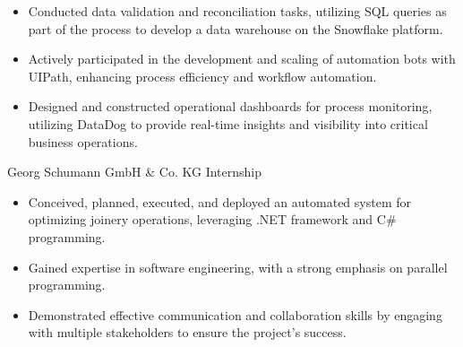 \documentclass[11pt, a4paper]{moderncv}
\newcommand{\de}[1]{}
\newcommand{\en}[1]{#1}
\newcommand{\de}[1]{#1}
\newcommand{\en}[1]{}
\begin{document}
        {\en{
        \begin{itemize}
            \item Conducted data validation and reconciliation tasks, utilizing SQL queries as part of the process to develop a data warehouse on the Snowflake platform.
            \item Actively participated in the development and scaling of automation bots with UIPath, enhancing process efficiency and workflow automation.
            \item Designed and constructed operational dashboards for process monitoring, utilizing DataDog to provide real-time insights and visibility into critical business operations.
        \end{itemize}}
        \de{
        \begin{itemize}
            \item Durchführung von Datenvalidierungs- und Abgleichsaufgaben unter Verwendung von SQL-Abfragen als Teil des Prozesses zur Entwicklung eines Data Warehouse auf der Snowflake-Plattform.
            \item Aktive Beteiligung an der Entwicklung und Skalierung von Automatisierungsrobotern mit UIPath zur Verbesserung der Prozesseffizienz und Workflow-Automatisierung.
            \item Entwicklung und Erstellung von operativen Dashboards für die Prozessüberwachung unter Verwendung von DataDog, um Echtzeiteinblicke und Einblicke in kritische Geschäftsvorgänge zu ermöglichen.
        \end{itemize}}
        }
        {Georg Schumann GmbH \& Co. KG}
        {\en{Internship}\de{Praktikum}}
        {}
        {}
        {\en{
        \begin{itemize}
            \item Conceived, planned, executed, and deployed an automated system for optimizing joinery operations, leveraging .NET framework and C\# programming.
            \item Gained expertise in software engineering, with a strong emphasis on parallel programming.
            \item Demonstrated effective communication and collaboration skills by engaging with multiple stakeholders to ensure the project's success.
        \end{itemize}}
        \de{
        \begin{itemize}
            \item Konzeption, Planung, Ausführung und Einsatz eines automatisierten Systems zur Optimierung von Abbundarbeiten unter Verwendung von .NET Framework und C\#-Programmierung
            \item Erlangung von Fachkenntnissen in der Softwareentwicklung mit Schwerpunkt auf paralleler Programmierung.
            \item Demonstration effektiver Kommunikations- und Kooperationsfähigkeiten durch die Zusammenarbeit mit verschiedenen Interessengruppen, um den Erfolg des Projekts zu gewährleisten.
        \end{itemize}}
        }
\end{document}

